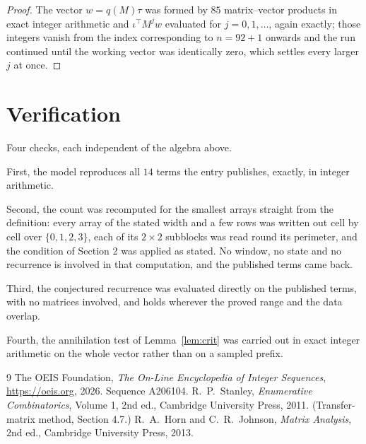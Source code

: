 \documentclass[11pt,a4paper]{article}
\theoremstyle{plain}
\theoremstyle{definition}
\begin{document}
\begin{proof}
The vector $w=q(M)\tau$ was formed by $85$ matrix--vector products in exact integer
arithmetic and $\iota^{\!\top}M^{j}w$ evaluated for $j=0,1,\dots$, again exactly; those
integers vanish from the index corresponding to $n=92+1$ onwards and the run continued
until the working vector was identically zero, which settles every larger $j$ at once.
\end{proof}

\section{Verification}

Four checks, each independent of the algebra above.

First, the model reproduces all $14$ terms the entry publishes, exactly, in integer
arithmetic.

Second, the count was recomputed for the smallest arrays straight from the definition: every
array of the stated width and a few rows was written out cell by cell over $\{0,1,2,3\}$, each of
its $2\times2$ subblocks was read round its perimeter, and the condition of Section 2 was
applied as stated. No window, no state and no recurrence is involved in that computation, and
the published terms came back.

Third, the conjectured recurrence was evaluated directly on the published terms, with no
matrices involved, and holds wherever the proved range and the data overlap.

Fourth, the annihilation test of Lemma~\ref{lem:crit} was carried out in exact integer
arithmetic on the whole vector rather than on a sampled prefix.

\begin{thebibliography}{9}
 The OEIS Foundation, \emph{The On-Line Encyclopedia of Integer
Sequences}, \url{https://oeis.org}, 2026. Sequence A206104.
 R.~P.~Stanley, \emph{Enumerative Combinatorics}, Volume 1, 2nd ed.,
Cambridge University Press, 2011. (Transfer-matrix method, Section 4.7.)
 R.~A.~Horn and C.~R.~Johnson, \emph{Matrix Analysis}, 2nd ed., Cambridge
University Press, 2013.
\end{thebibliography}
\end{document}
